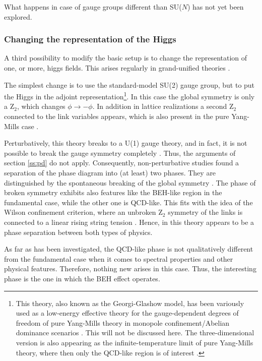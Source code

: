 \documentclass[final,12pt]{article}
\newcommand*{\1}{1\!\!\!\bot}
\begin{document}
What happens in case of gauge groups different than SU($N$) has not yet been explored.

\subsubsection{Changing the representation of the Higgs}\label{sss:rep}

A third possibility to modify the basic setup is to change the representation of one, or more, higgs fields. This arises regularly in grand-unified theories \cite{Bohm:2001yx,Langacker:1980js}.

The simplest change is to use the standard-model SU(2) gauge group, but to put the Higgs in the adjoint representation\footnote{This theory, also known as the Georgi-Glashow model, has been variously used as a low-energy effective theory for the gauge-dependent degrees of freedom of pure Yang-Mills theory in monopole confinement/Abelian dominance scenarios \cite{Greensite:2011zz,Ripka:2003vv,Kondo:2016ywd,Nishino:2018mwi}. This will not be discussed here. The three-dimensional version is also appearing as the infinite-temperature limit of pure Yang-Mills theory, where then only the QCD-like region is of interest \cite{Kajantie:1995dw,Maas:2011se,Hart:1999dj,Cucchieri:2001tw,Maas:2004se}.}. In this case the global symmetry is only a Z$_2$, which changes $\phi\to-\phi$. In addition in lattice realizations a second Z$_2$ connected to the link variables appears, which is also present in the pure Yang-Mills case \cite{Gattringer:2010zz}.

Perturbatively, this theory breaks to a U(1) gauge theory, and in fact, it is not possible to break the gauge symmetry completely \cite{O'Raifeartaigh:1986vq}. Thus, the arguments of section \ref{ss:pd} do not apply. Consequently, non-perturbative studies found a separation of the phase diagram into (at least) two phases. They are distinguished by the spontaneous breaking of the global symmetry \cite{Lang:1981qg,Drouffe:1984hb,Baier:1986ni,Capri:2012cr,Kondo:2016ywd}. The phase of broken symmetry exhibits also features like the BEH-like region in the fundamental case, while the other one is QCD-like. This fits with the idea of the Wilson confinement criterion, where an unbroken Z$_2$ symmetry of the links is connected to a linear rising string tension \cite{Greensite:2011zz,Gattringer:2010zz}. Hence, in this theory appears to be a phase separation between both types of physics.

As far as has been investigated, the QCD-like phase is not qualitatively different from the fundamental case when it comes to spectral properties and other physical features. Therefore, nothing new arises in this case. Thus, the interesting phase is the one in which the BEH effect operates. 
\end{document}
